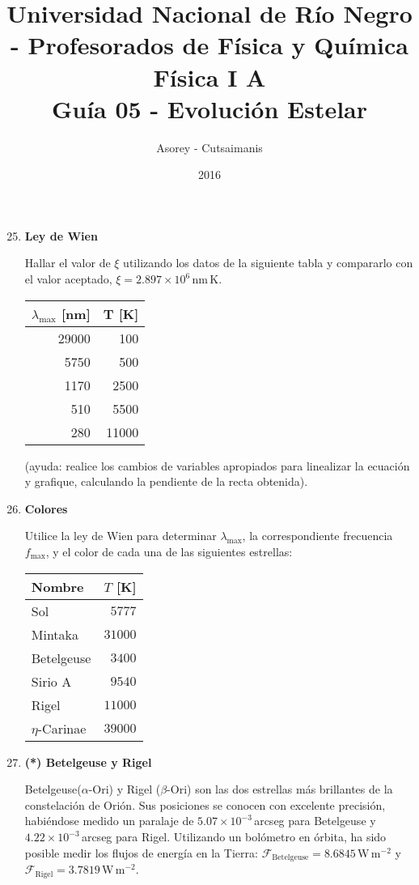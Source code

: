 \documentclass[a4paper,12pt]{article}
\begin{document}
\title{
{\normalsize{Universidad Nacional de Río Negro - Profesorados de Física y
Química}}\\ Física I A \\ Guía 05 - Evolución Estelar}
\author{Asorey - Cutsaimanis}
\date{2016}
\maketitle

\begin{enumerate}
\setcounter{enumi}{24}      %

\item{\bf{Ley de Wien}}

Hallar el valor de $\xi$ utilizando los datos de la siguiente tabla y
compararlo con el valor aceptado, $\xi = 2.897 \times 10^6$\,nm\,K.

\begin{tabular}{ r | r }
$\lambda_{\max}$ [nm] & T [K]\\
\hline
29000 & 100 \\
5750 & 500 \\
1170 & 2500 \\
510 & 5500 \\
280 & 11000
\end{tabular}
(ayuda: realice los cambios de variables apropiados para linealizar la ecuación
y grafique, calculando la pendiente de la recta obtenida).

\item{\bf{Colores}}

Utilice la ley de Wien para determinar $\lambda_{\max}$, la correspondiente
frecuencia $f_{\max}$, y el color de cada una de las siguientes estrellas: 

\begin{tabular}{ l | r }
Nombre & $T$ [K] \\
\hline
Sol & $5777$ \\
Mintaka & $31000$ \\
Betelgeuse & $3400$ \\
Sirio A & $9540$ \\
Rigel & $11000$ \\
$\eta$-Carinae & $39000$
\end{tabular}

\item{\bf{(*) Betelgeuse y Rigel}}

Betelgeuse($\alpha$-Ori) y Rigel ($\beta$-Ori) son las dos estrellas más
brillantes de la constelación de Orión. Sus posiciones se conocen con excelente
precisión, habiéndose medido un paralaje de $5.07\times10^{-3}$\,arcseg para
Betelgeuse y  $4.22\times10^{-3}$\,arcseg para Rigel. Utilizando un bolómetro
en órbita, ha sido posible medir los flujos de energía en la Tierra:
$\mathcal{F}_{\mathrm{Betelgeuse}} = 8.6845$\,W\,m$^{-2}$ y
$\mathcal{F}_{\mathrm{Rigel}} = 3.7819$\,W\,m$^{-2}$.
 

\end{enumerate}
\end{document}
